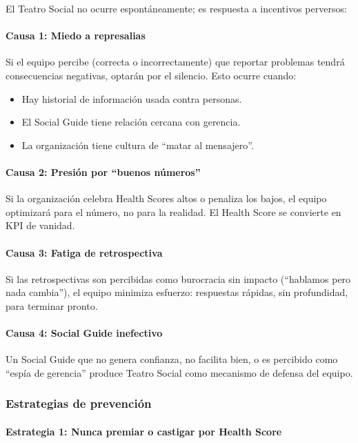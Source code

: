 El Teatro Social no ocurre espontáneamente; es respuesta a incentivos perversos:

\paragraph{Causa 1: Miedo a represalias}

Si el equipo percibe (correcta o incorrectamente) que reportar problemas tendrá consecuencias negativas, optarán por el silencio. Esto ocurre cuando:
\begin{itemize}
    \item Hay historial de información usada contra personas.
    \item El Social Guide tiene relación cercana con gerencia.
    \item La organización tiene cultura de ``matar al mensajero''.
\end{itemize}

\paragraph{Causa 2: Presión por ``buenos números''}

Si la organización celebra Health Scores altos o penaliza los bajos, el equipo optimizará para el número, no para la realidad. El Health Score se convierte en KPI de vanidad.

\paragraph{Causa 3: Fatiga de retrospectiva}

Si las retrospectivas son percibidas como burocracia sin impacto (``hablamos pero nada cambia''), el equipo minimiza esfuerzo: respuestas rápidas, sin profundidad, para terminar pronto.
\paragraph{Causa 4: Social Guide inefectivo}

Un Social Guide que no genera confianza, no facilita bien, o es percibido como ``espía de gerencia'' produce Teatro Social como mecanismo de defensa del equipo.

\subsubsection{Estrategias de prevención}

\paragraph{Estrategia 1: Nunca premiar o castigar por Health Score}\mbox{}\\[-0.3\baselineskip]

